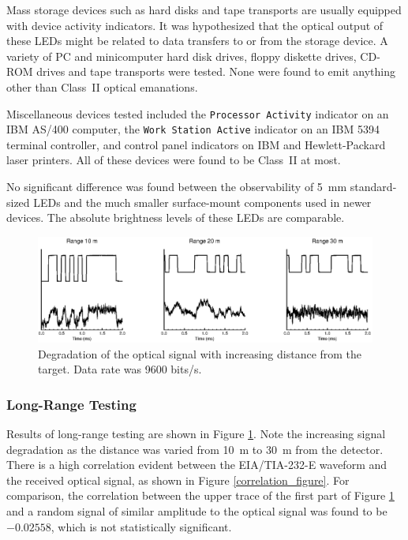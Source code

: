 \documentclass{acmtrans2e}
\begin{document}
Mass storage devices such as hard disks and tape transports are usually 
equipped with device activity indicators.  It was hypothesized that the
optical output of 
these LEDs might be related to data transfers to or from the storage 
device.  A variety of PC and minicomputer hard disk drives, floppy 
diskette drives, CD-ROM drives and tape transports were tested.  None 
were found to emit anything other than Class~II optical emanations.
 
Miscellaneous devices tested included the {\tt Processor Activity}
indicator on an IBM AS/400 computer, the {\tt Work Station Active}
indicator on an IBM 5394 terminal controller, and control panel 
indicators on IBM and Hewlett-Packard laser printers.  All of these 
devices were found to be Class~II at most.
 
No significant difference was found between the observability of 5~mm
standard-sized LEDs and the much smaller surface-mount components
used in newer devices.  The absolute brightness levels of these LEDs
are comparable.

\begin{figure}
\centering
\includegraphics[width=\textwidth]{Figure_6.eps}
\caption{Degradation of the optical signal with increasing distance
from the target. Data rate was 9600 bits/s.}
\label{three_captures_in_a_row}
\end{figure}

\subsubsection{Long-Range Testing}

Results of long-range testing are shown in Figure 
\ref{three_captures_in_a_row}.  Note the increasing signal degradation
as the distance was varied from 10~m to 30~m from the detector.  There
is a high correlation evident between the
EIA/TIA-232-E waveform and the received optical signal, as shown in Figure 
\ref{correlation_figure}.  For comparison, the correlation between the 
upper trace of the first part of Figure \ref{three_captures_in_a_row} 
and a random signal of similar amplitude to the optical signal was found to be
$-0.02558$, which is not statistically significant.
\end{document}
